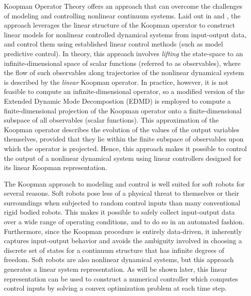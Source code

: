 Koopman Operator Theory offers an approach that can overcome the challenges of modeling and controlling nonlinear continuum systems.
Laid out in \citet{mauroy2016linear} and \citet{korda2018linear}, the approach leverages the linear structure of the Koopman operator to construct linear models for nonlinear controlled dynamical systems from input-output data, and control them using established linear control methods (such as model predictive control).
In theory, this approach involves \emph{lifting} the state-space to an infinite-dimensional space of scalar functions (referred to as observables), where the flow of such observables along trajectories of the nonlinear dynamical system is described by the \emph{linear} Koopman operator.
In practice, however, it is not feasible to compute an infinite-dimensional operator, so a modified version of the Extended Dynamic Mode Decompostion (EDMD) is employed to compute a finite-dimensional projection of the Koopman operator onto a finite-dimensional subspace of all observables (scalar functions).
This approximation of the Koopman operator describes the evolution of the values of the output variables themselves, provided that they lie within the finite subspace of observables upon which the operator is projected.
Hence, this approach makes it possible to control the output of a nonlinear dynamical system using linear controllers designed for its linear Koopman representation.

The Koopman approach to modeling and control is well suited for soft robots for several reasons.
Soft robots pose less of a physical threat to themselves or their surroundings when subjected to random control inputs than many conventional rigid bodied robots. 
This makes it possible to safely collect input-output data over a wide range of operating conditions, and to do so in an automated fashion. 
Furthermore, since the Koopman procedure is entirely data-driven, it inherently captures input-output behavior and avoids the ambiguity involved in choosing a discrete set of states for a continuum structure that has infinite degrees of freedom.
Soft robots are also nonlinear dynamical systems, but this approach generates a linear system representation.
As will be shown later, this linear representation can be used to construct a numerical controller which computes control inputs by solving a convex optimization problem at each time step.

